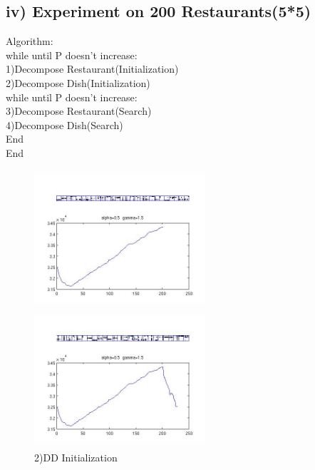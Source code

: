 \documentclass{article}
\begin{document}
\begin{spacing}{1.1}
\subsection{iv) Experiment on 200 Restaurants(5*5)}
Algorithm:\\
while until P doesn't increase:\\
1)Decompose Restaurant(Initialization)\\
2)Decompose Dish(Initialization)\\
while until P doesn't increase:\\
3)Decompose Restaurant(Search)\\
4)Decompose Dish(Search)\\
End\\
End\\
\begin{figure}[h] 
  \begin{minipage}[b]{0.5\textwidth} 
    \centering 
    \includegraphics[width=2.5in,height=2in]{200_initr.jpg} 
    \caption{1)DR Initialization}
    \label{fig:by:table} 
  \end{minipage}%
  \begin{minipage}[b]{0.5\textwidth} 
    \centering 
    \includegraphics[width=2.5in,height=2in]{200_initrd.jpg} 
    \caption{2)DD Initialization}
    \label{fig:by:table}  
   \end{minipage}%
\end{figure}
\begin{figure}[h] 
  \begin{minipage}[b]{0.5\textwidth} 

\end{minipage}
\end{figure}
\end{spacing}
\end{document}
